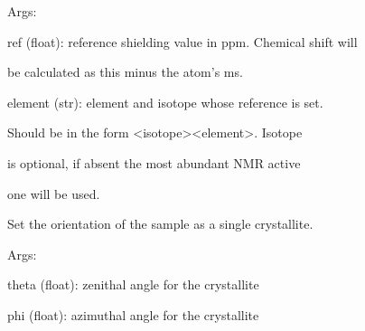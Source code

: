 \documentclass[letterpaper,10pt,english]{sphinxmanual}
\begin{document}
\begin{fulllineitems}
\begin{fulllineitems}
\begin{DUlineblock}{0em}
\item[] Args:
\item[]
\begin{DUlineblock}{\DUlineblockindent}
\item[] ref (float): reference shielding value in ppm. Chemical shift will
\item[]
\begin{DUlineblock}{\DUlineblockindent}
\item[] be calculated as this minus the atom's ms.
\end{DUlineblock}
\item[] element (str): element and isotope whose reference is set.
\item[]
\begin{DUlineblock}{\DUlineblockindent}
\item[] Should be in the form \textless{}isotope\textgreater{}\textless{}element\textgreater{}. Isotope
\item[] is optional, if absent the most abundant NMR active
\item[] one will be used.
\end{DUlineblock}
\end{DUlineblock}
\end{DUlineblock}

\end{fulllineitems}


\begin{fulllineitems}
\label{doctree/soprano.calculate.nmr.nmr:soprano.calculate.nmr.nmr.NMRCalculator.set_single_crystal}
Set the orientation of the sample as a single crystallite.

\begin{DUlineblock}{0em}
\item[] Args:
\item[]
\begin{DUlineblock}{\DUlineblockindent}
\item[] theta (float): zenithal angle for the crystallite
\item[] phi (float): azimuthal angle for the crystallite
\end{DUlineblock}
\end{DUlineblock}

\end{fulllineitems}


\end{fulllineitems}
\end{document}
